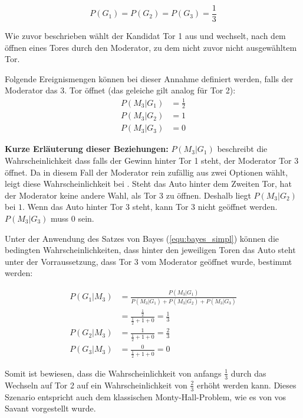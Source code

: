 \begin{equation}
    P(G_1)=P(G_2)=P(G_3)=\frac{1}{3}
\end{equation}

Wie zuvor beschrieben wählt der Kandidat Tor 1 aus und wechselt, nach dem öffnen eines Tores durch den Moderator, zu dem nicht zuvor nicht ausgewähltem Tor.

Folgende Ereignismengen können bei dieser Annahme definiert werden, falls der Moderator das 3. Tor öffnet (das geleiche gilt analog für Tor 2):
\begin{equation}
    \begin{split}
        P(M_3 | G_1) & = \frac{1}{2} \\
        P(M_3 | G_2) & = 1 \\
        P(M_3 | G_3) & = 0
    \end{split}
\end{equation}

\textbf{Kurze Erläuterung dieser Beziehungen:} $P(M_3 | G_1)$ beschreibt die Wahrscheinlichkeit dass falls der Gewinn hinter Tor 1 steht, der Moderator Tor 3 öffnet. Da in diesem Fall der Moderator rein zufällig aus zwei Optionen wählt, leigt diese Wahrscheinlichkeit bei . Steht das Auto hinter dem Zweiten Tor, hat der Moderator keine andere Wahl, als Tor 3 zu öffnen. Deshalb liegt $P(M_3 | G_2)$ bei $1$. Wenn das Auto hinter Tor 3 steht, kann Tor 3 nicht geöffnet werden. $P(M_3 | G_3)$ muss $0$ sein.

Unter der Anwendung des Satzes von Bayes (\autoref{equ:bayes_simpl}) können die bedingten Wahrscheinlichkeiten, dass hinter den jeweiligen Toren das Auto steht unter der Vorraussetzung, dass Tor 3 vom Moderator geöffnet wurde, bestimmt werden:

\begin{equation}
    \begin{split}
        P(G_1 | M_3) & = \frac{P(M_3 | G_1)}{P(M_3 | G_1) +
            P(M_3 | G_2) + P(M_3 | G_3)} \\
        & = \frac{\frac{1}{2}}{\frac{1}{2}+1+0} = \frac{1}{3}\\
        P(G_2 | M_3) & = \frac{1}{\frac{1}{2}+1+0} = \frac{2}{3} \\
        P(G_3 | M_3) & = \frac{0}{\frac{1}{2}+1+0} = 0
    \end{split}
\end{equation}

Somit ist bewiesen, dass die Wahrscheinlichkeit von anfangs $\frac{1}{3}$ durch das Wechseln auf Tor 2 auf ein Wahrscheinlichkeit von $\frac{2}{3}$ erhöht werden kann. Dieses Szenario entspricht auch dem klassischen Monty-Hall-Problem, wie es von vos Savant vorgestellt wurde.

